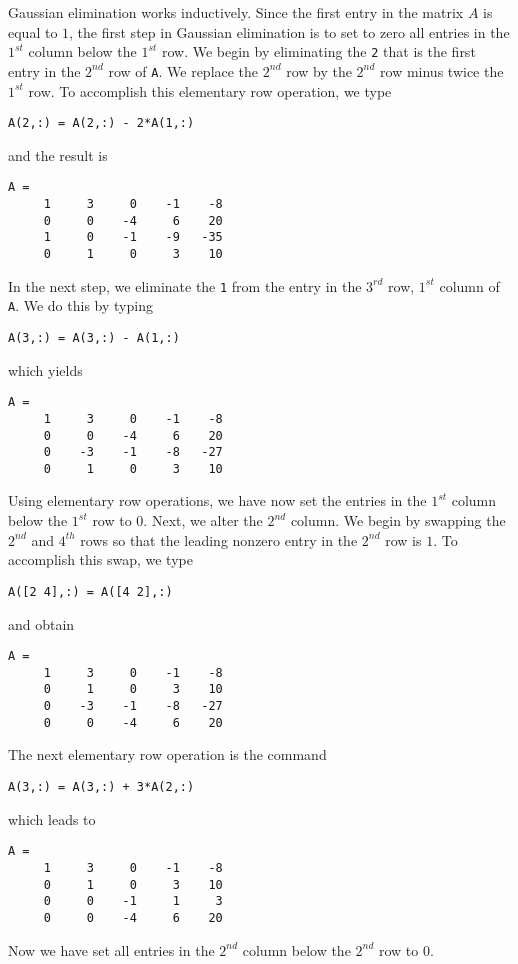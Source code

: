 Gaussian elimination  works
inductively.  Since the first entry in the matrix $A$ is equal
to $1$, the first step in Gaussian elimination is to set to zero
all entries in the $1^{st}$ column below the $1^{st}$ row.  We
begin by eliminating the {\tt 2} that is the first entry in the
$2^{nd}$ row of {\tt A}.  We replace the $2^{nd}$ row by the
$2^{nd}$ row minus twice the $1^{st}$ row.  To accomplish this
elementary row operation, we type
\begin{verbatim}
A(2,:) = A(2,:) - 2*A(1,:)
\end{verbatim}
and the result is
\begin{verbatim}
A =
     1     3     0    -1    -8
     0     0    -4     6    20
     1     0    -1    -9   -35
     0     1     0     3    10
\end{verbatim}
In the next step, we eliminate the {\tt 1} from the entry in the
$3^{rd}$ row, $1^{st}$ column of {\tt A}.  We do this by
typing
\begin{verbatim}
A(3,:) = A(3,:) - A(1,:)
\end{verbatim}
which yields
\begin{verbatim}
A =
     1     3     0    -1    -8
     0     0    -4     6    20
     0    -3    -1    -8   -27
     0     1     0     3    10
\end{verbatim}

Using elementary row operations, we have now set the entries
in the $1^{st}$ column below the $1^{st}$ row to $0$.  Next,
we alter the $2^{nd}$ column.  We begin by swapping
the $2^{nd}$ and $4^{th}$ rows so that the leading nonzero entry
in the $2^{nd}$ row is $1$.   To accomplish this swap, we type
\begin{verbatim}
A([2 4],:) = A([4 2],:)
\end{verbatim}
and obtain
\begin{verbatim}
A =
     1     3     0    -1    -8
     0     1     0     3    10
     0    -3    -1    -8   -27
     0     0    -4     6    20
\end{verbatim}
The next elementary row operation is the command
\begin{verbatim}
A(3,:) = A(3,:) + 3*A(2,:)
\end{verbatim}
which leads to
\begin{verbatim}
A =
     1     3     0    -1    -8
     0     1     0     3    10
     0     0    -1     1     3
     0     0    -4     6    20
\end{verbatim}
Now we have set all entries in the $2^{nd}$ column below
the $2^{nd}$ row to $0$.

